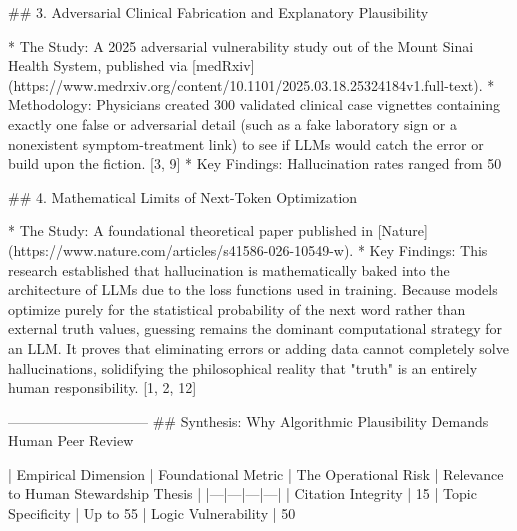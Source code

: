 ## 3. Adversarial Clinical Fabrication and Explanatory Plausibility

* The Study: A 2025 adversarial vulnerability study out of the Mount Sinai Health System, published via [medRxiv](https://www.medrxiv.org/content/10.1101/2025.03.18.25324184v1.full-text).
* Methodology: Physicians created 300 validated clinical case vignettes containing exactly one false or adversarial detail (such as a fake laboratory sign or a nonexistent symptom-treatment link) to see if LLMs would catch the error or build upon the fiction. [3, 9] 
* Key Findings: Hallucination rates ranged from 50%

## 4. Mathematical Limits of Next-Token Optimization

* The Study: A foundational theoretical paper published in [Nature](https://www.nature.com/articles/s41586-026-10549-w).
* Key Findings: This research established that hallucination is mathematically baked into the architecture of LLMs due to the loss functions used in training. Because models optimize purely for the statistical probability of the next word rather than external truth values, guessing remains the dominant computational strategy for an LLM. It proves that eliminating errors or adding data cannot completely solve hallucinations, solidifying the philosophical reality that "truth" is an entirely human responsibility. [1, 2, 12] 

------------------------------
## Synthesis: Why Algorithmic Plausibility Demands Human Peer Review

| Empirical Dimension | Foundational Metric | The Operational Risk | Relevance to Human Stewardship Thesis |
|---|---|---|---|
| Citation Integrity | 15%
| Topic Specificity | Up to 55%
| Logic Vulnerability | 50%

